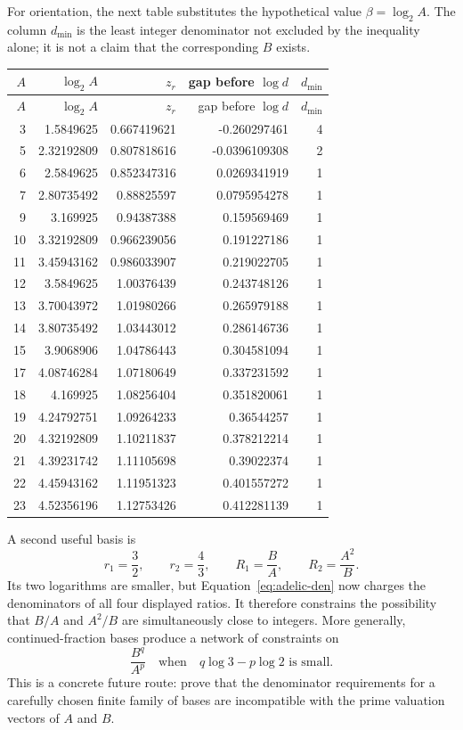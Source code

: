 \documentclass[11pt,oneside]{article}
\theoremstyle{definition}
\theoremstyle{remark}
\begin{document}
For orientation, the next table substitutes the hypothetical value
$\beta=\log_2 A$.  The column $d_{\min}$ is the least integer denominator not
excluded by the inequality alone; it is not a claim that the corresponding
$B$ exists.

\begin{center}
\begin{longtable}{rrrrr}
\toprule
$A$ & $\log_2A$ & $z_r$ & gap before $\log d$ & $d_{\min}$ \\
\midrule
\endfirsthead
\toprule
$A$ & $\log_2A$ & $z_r$ & gap before $\log d$ & $d_{\min}$ \\
\midrule
\endhead
3 & 1.5849625 & 0.667419621 & -0.260297461 & 4 \\
5 & 2.32192809 & 0.807818616 & -0.0396109308 & 2 \\
6 & 2.5849625 & 0.852347316 & 0.0269341919 & 1 \\
7 & 2.80735492 & 0.88825597 & 0.0795954278 & 1 \\
9 & 3.169925 & 0.94387388 & 0.159569469 & 1 \\
10 & 3.32192809 & 0.966239056 & 0.191227186 & 1 \\
11 & 3.45943162 & 0.986033907 & 0.219022705 & 1 \\
12 & 3.5849625 & 1.00376439 & 0.243748126 & 1 \\
13 & 3.70043972 & 1.01980266 & 0.265979188 & 1 \\
14 & 3.80735492 & 1.03443012 & 0.286146736 & 1 \\
15 & 3.9068906 & 1.04786443 & 0.304581094 & 1 \\
17 & 4.08746284 & 1.07180649 & 0.337231592 & 1 \\
18 & 4.169925 & 1.08256404 & 0.351820061 & 1 \\
19 & 4.24792751 & 1.09264233 & 0.36544257 & 1 \\
20 & 4.32192809 & 1.10211837 & 0.378212214 & 1 \\
21 & 4.39231742 & 1.11105698 & 0.39022374 & 1 \\
22 & 4.45943162 & 1.11951323 & 0.401557272 & 1 \\
23 & 4.52356196 & 1.12753426 & 0.412281139 & 1 \\
\bottomrule
\end{longtable}
\end{center}

A second useful basis is
\[
 r_1=\frac32,\qquad r_2=\frac43,
 \qquad R_1=\frac BA,\qquad R_2=\frac{A^2}{B}.
\]
Its two logarithms are smaller, but Equation~\eqref{eq:adelic-den} now charges
the denominators of all four displayed ratios.  It therefore constrains the
possibility that $B/A$ and $A^2/B$ are simultaneously close to integers.  More
generally, continued-fraction bases produce a network of constraints on
\[
 \frac{B^q}{A^p}
 \quad\text{when}\quad q\log3-p\log2\text{ is small}.
\]
This is a concrete future route: prove that the denominator requirements for a
carefully chosen finite family of bases are incompatible with the prime
valuation vectors of $A$ and $B$.
\end{document}
